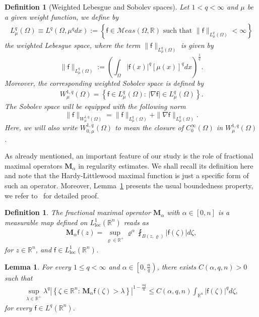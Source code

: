 \documentclass[a4paper, 11pt]{article}
\newtheorem{definition}[theorem]{Definition}
\newtheorem{lemma}[theorem]{Lemma}
\begin{document}
\begin{definition}[Weighted Lebesgue and Sobolev spaces] Let $1<q<\infty$ and $\mu$ be a given weight function, we define by
\begin{align*}
L^q_{\mu}(\Omega) \equiv L^q(\Omega,\mu^qdx) := \left\{\mathsf{f} \in \mathcal{M}eas(\Omega,\mathbb{R}) \mbox{ such that } \|\mathsf{f}\|_{L^q_{\mu}(\Omega)}< \infty\right\}
\end{align*}
the weighted Lebesgue space, where the term $\|\mathsf{f}\|_{L^q_{\mu}(\Omega)}$ is given by
$$\|\mathsf{f}\|_{L^q_{\mu}(\Omega)} := \left(\int_{\Omega} |\mathsf{f}(x)|^q [\mu(x)]^q dx\right)^{\frac{1}{q}}.$$ 
Moreover, the corresponding weighted Sobolev space is defined by
\begin{align*}
W^{1,q}_{\mu}(\Omega) = \left\{\mathsf{f} \in L^q_{\mu}(\Omega): \, |\nabla \mathsf{f}| \in L^q_{\mu}(\Omega) \right\}.
\end{align*}
The Sobolev space will be equipped with the following norm 
$$\|\mathsf{f}\|_{W^{1,q}_{\mu}(\Omega)} = \|\mathsf{f}\|_{L^q_{\mu}(\Omega)} + \|\nabla \mathsf{f}\|_{L^q_{\mu}(\Omega)}.$$ 
Here, we will also write $W^{1,q}_{0,\mu}(\Omega)$ to mean the closure of $C_0^{\infty}(\Omega)$ in $W^{1,q}_{\mu}(\Omega)$.
\end{definition}

As already mentioned, an important feature of our study is the role of fractional maximal operators $\mathbf{M}_\alpha$ in regularity estimates. We shall recall its definition here and note that the Hardy-Littlewood maximal function is just a specific form of such an operator. Moreover, Lemma~\ref{lem:bound-M-beta} presents the usual boundedness property, we refer to~\cite{PNJMAA} for detailed proof. 

\begin{definition}\label{def:Malpha}
The fractional maximal operator $\mathbf{M}_\alpha$ with $\alpha \in [0, n]$ is a measurable map defined on $L^1_{\mathrm{loc}}(\mathbb{R}^n)$ reads as
\begin{align}\label{eq:Malpha}
\mathbf{M}_\alpha \mathsf{f}(z) = \sup_{\varrho \in \mathbb{R}^+} {\varrho^{\alpha} \fint_{B(z,\varrho)}{|\mathsf{f}(\zeta)|d\zeta}},
\end{align}
for $z \in \mathbb{R}^n$, and $\mathsf{f} \in L^1_{\mathrm{loc}}(\mathbb{R}^n)$.
\end{definition} 

\begin{lemma}\label{lem:bound-M-beta}
For every $1 \le q < \infty$ and $\alpha \in \left[0,\frac{n}{q}\right)$, there exists $C(\alpha,q,n)>0$ such that
\begin{align*}
\sup_{\lambda \in \mathbb{R}^+} \lambda^{q} \left|\left\{\zeta \in \mathbb{R}^n: \, \mathbf{M}_{\alpha}\mathsf{f}(\zeta)>\lambda\right\}\right|^{1-\frac{\alpha q}{n}} \le C(\alpha,q,n) \int_{\mathbb{R}^n}|\mathsf{f}(\zeta)|^q d\zeta,
\end{align*}
for every $\mathsf{f} \in L^q(\mathbb{R}^n)$.
\end{lemma}
\end{document}
